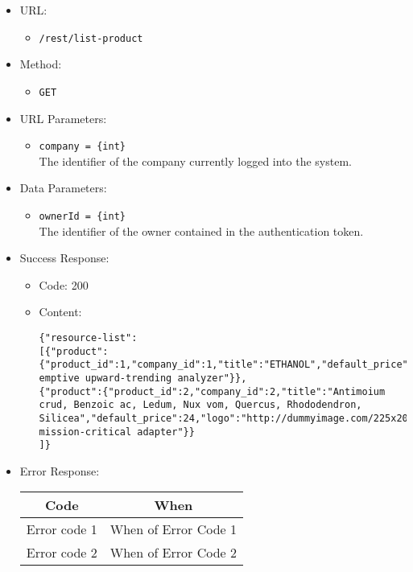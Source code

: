\begin{itemize}
    
    \item URL: 
    \begin{itemize}
        \item \texttt{/rest/list-product}
    \end{itemize}
    
    \item Method: 
    \begin{itemize}
        \item \texttt{GET}
    \end{itemize}
    
    \item URL Parameters: 
    \begin{itemize}
        \item \texttt{company = \{int\}} \\
        The identifier of the company currently logged into the system.
    \end{itemize}
    
    \item Data Parameters: 
    \begin{itemize}
        \item \texttt{ownerId = \{int\}} \\
        The identifier of the owner contained in the authentication token.
    \end{itemize}

    \item Success Response: 
    \begin{itemize}
        \item Code: 200
        \item Content:
        \begin{lstlisting}
{"resource-list":
[{"product":{"product_id":1,"company_id":1,"title":"ETHANOL","default_price":29,"logo":"http://dummyimage.com/222x224.png/5fa2dd/ffffff","measurement_unit":"Kg","description":"Pre-emptive upward-trending analyzer"}},
{"product":{"product_id":2,"company_id":2,"title":"Antimoium crud, Benzoic ac, Ledum, Nux vom, Quercus, Rhododendron, Silicea","default_price":24,"logo":"http://dummyimage.com/225x208.png/5fa2dd/ffffff","measurement_unit":"Kg","description":"Ameliorated mission-critical adapter"}}
]}
        \end{lstlisting}    
    \end{itemize}

    \item Error Response:
    \begin{table}[!h]
    \centering 
    \begin{tabular}{|c|c|}
    \hline
    \multicolumn{1}{|c|}{\textbf{Code}} & \multicolumn{1}{c|}{\textbf{When}} \\ \hline
    Error code 1 & When of Error Code 1 \\\hline
    Error code 2 & When of Error Code 2 \\\hline
    \end{tabular} 
    \end{table} 
    
\end{itemize}



